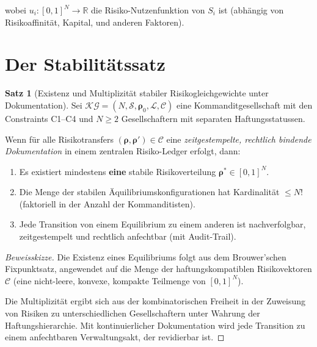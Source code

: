\documentclass[a4paper, 12pt, twoside, openright]{report}
\theoremstyle{definition}
\theoremstyle{definition}
\newtheorem{satz}{Satz}[chapter]
\begin{document}
wobei $u_i : [0,1]^N \to \mathbb{R}$ die Risiko-Nutzenfunktion von $S_i$ ist (abhängig von Risikoaffinität, Kapital, und anderen Faktoren).

\section{Der Stabilitätssatz}

\begin{satz}[Existenz und Multiplizität stabiler Risikogleichgewichte unter Dokumentation]
\label{satz:risikoequilibrium}
Sei $\mathcal{KG} = (N, \mathcal{S}, \boldsymbol{\rho}_0, \mathcal{L}, \mathcal{C})$ eine Kommanditgesellschaft mit den Constraints C1--C4 und $N \geq 2$ Gesellschaftern mit separaten Haftungsstatussen. 

Wenn für alle Risikotransfers $({\boldsymbol{\rho}}, {\boldsymbol{\rho}}') \in \mathcal{C}$ eine \emph{zeitgestempelte, rechtlich bindende Dokumentation} in einem zentralen Risiko-Ledger erfolgt, dann:

\begin{enumerate}
    \item Es existiert mindestens \textbf{eine} stabile Risikoverteilung $\boldsymbol{\rho}^* \in [0,1]^N$.
    
    \item Die Menge der stabilen Äquilibriumskonfigurationen hat Kardinalität $\leq N!$ (faktoriell in der Anzahl der Kommanditisten).
    
    \item Jede Transition von einem Equilibrium zu einem anderen ist nachverfolgbar, zeitgestempelt und rechtlich anfechtbar (mit Audit-Trail).
\end{enumerate}
\end{satz}

\begin{proof}[Beweisskizze]
Die Existenz eines Equilibriums folgt aus dem Brouwer'schen Fixpunktsatz, angewendet auf die Menge der haftungskompatiblen Risikovektoren $\mathcal{C}$ (eine nicht-leere, konvexe, kompakte Teilmenge von $[0,1]^N$). 

Die Multiplizität ergibt sich aus der kombinatorischen Freiheit in der Zuweisung von Risiken zu unterschiedlichen Gesellschaftern unter Wahrung der Haftungshierarchie. Mit kontinuierlicher Dokumentation wird jede Transition zu einem anfechtbaren Verwaltungsakt, der revidierbar ist.
\end{proof}
\end{document}

